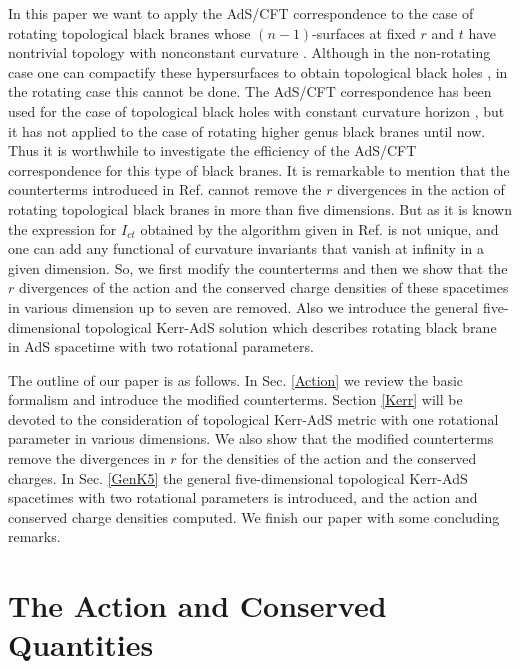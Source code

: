 \documentclass[a4paper,12pt,onecolumn]{revtex4}
\begin{document}
In this paper we want to apply the AdS/CFT correspondence to the
case of rotating topological black branes whose $(n-1)$-surfaces
at fixed $r$ and $t$ have nontrivial topology with nonconstant
curvature \cite{Kl97,Kl98}. Although in the non-rotating case one
can compactify these hypersurfaces to obtain topological black
holes \cite{TBH1,TBH2}, in the rotating case this cannot be done.
The AdS/CFT correspondence has been used for the case of
topological black holes with constant curvature horizon
\cite{Emp,Cai,Ghez}, but it has not applied to the case of
rotating higher genus black branes until now. Thus it is
worthwhile to investigate the efficiency of the AdS/CFT
correspondence for this type of black branes. It is remarkable to
mention that the counterterms introduced in Ref. \cite{Kls} cannot
remove the $r$ divergences in the action of rotating topological
black branes in more than five dimensions. But as it is known the
expression for $I_{ct}$ obtained by the algorithm given in Ref.
\cite{Kls} is not unique, and one can add any functional of
curvature invariants that vanish at infinity in a given dimension.
So, we first modify the counterterms and then we show that the $r$
divergences of the action and the conserved charge densities of
these spacetimes in various dimension up to seven are removed.
Also we introduce the general five-dimensional topological
Kerr-AdS solution which describes rotating black brane in AdS
spacetime with two rotational parameters.

The outline of our paper is as follows. In Sec. \ref{Action} we review the
basic formalism and introduce the modified counterterms. Section \ref{Kerr}
will be devoted to the consideration of topological Kerr-AdS metric with one
rotational parameter in various dimensions. We also show that the modified
counterterms remove the divergences in $r$ for the densities of the action
and the conserved charges. In Sec. \ref{GenK5} the general five-dimensional
topological Kerr-AdS spacetimes with two rotational parameters is
introduced, and the action and conserved charge densities computed. We
finish our paper with some concluding remarks.

\section{The Action and Conserved Quantities\label{Action}}
\end{document}
